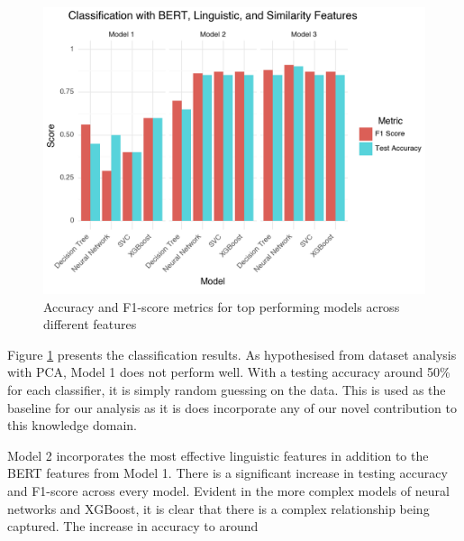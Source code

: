 \documentclass{article}
\begin{document}
\begin{figure}[!hbp]
  \centering
  \includegraphics[]{img/accuracy_combined_graph.png}
  \caption{Accuracy and F1-score metrics for top performing models across different features}
  \label{accuracy_graph}
\end{figure}

Figure \ref{accuracy_graph} presents the classification results. As hypothesised from dataset analysis with PCA, Model 1 does not perform well. With a testing accuracy around 50\% for each classifier, it is simply random guessing on the data. This is used as the baseline for our analysis as it is does incorporate any of our novel contribution to this knowledge domain.

Model 2 incorporates the most effective linguistic features in addition to the BERT features from Model 1. There is a significant increase in testing accuracy and F1-score across every model. Evident in the more complex models of neural networks and XGBoost, it is clear that there is a complex relationship being captured. The increase in accuracy to around
\end{document}

